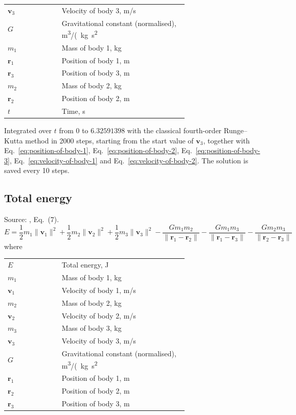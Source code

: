 \noindent\begin{tabular}{@{\quad}l@{\quad}p{0.7\linewidth}@{}}
  $\mathbf{v}_3$ & Velocity of body 3, \si{m/s} \\
  $G$ & Gravitational constant (normalised), \si{m^{3}/(kg.s^{2}} \\
  $m_1$ & Mass of body 1, \si{kg} \\
  $\mathbf{r}_1$ & Position of body 1, \si{m} \\
  $\mathbf{r}_3$ & Position of body 3, \si{m} \\
  $m_2$ & Mass of body 2, \si{kg} \\
  $\mathbf{r}_2$ & Position of body 2, \si{m} \\
  $t$ & Time, \si{s} \\
\end{tabular}

\noindent Integrated over $t$ from $0$ to $6.32591398$ with the classical fourth-order Runge–Kutta method in 2000 steps, starting from the start value of $\mathbf{v}_3$, together with Eq.~\eqref{eq:position-of-body-1}, Eq.~\eqref{eq:position-of-body-2}, Eq.~\eqref{eq:position-of-body-3}, Eq.~\eqref{eq:velocity-of-body-1} and Eq.~\eqref{eq:velocity-of-body-2}. The solution is saved every 10 steps.

\subsection{Total energy}
Source: \cite{ref}, Eq.~(7).
\begin{equation}
  E = \frac{1}{2} m_1 \|\mathbf{v}_1\|^2 + \frac{1}{2} m_2 \|\mathbf{v}_2\|^2 + \frac{1}{2} m_3 \|\mathbf{v}_3\|^2 - \frac{G m_1 m_2}{\|\mathbf{r}_1 - \mathbf{r}_2\|} - \frac{G m_1 m_3}{\|\mathbf{r}_1 - \mathbf{r}_3\|} - \frac{G m_2 m_3}{\|\mathbf{r}_2 - \mathbf{r}_3\|}
  \label{eq:total-energy}
\end{equation}
\noindent where

\noindent\begin{tabular}{@{\quad}l@{\quad}p{0.7\linewidth}@{}}
  $E$ & Total energy, \si{J} \\
  $m_1$ & Mass of body 1, \si{kg} \\
  $\mathbf{v}_1$ & Velocity of body 1, \si{m/s} \\
  $m_2$ & Mass of body 2, \si{kg} \\
  $\mathbf{v}_2$ & Velocity of body 2, \si{m/s} \\
  $m_3$ & Mass of body 3, \si{kg} \\
  $\mathbf{v}_3$ & Velocity of body 3, \si{m/s} \\
  $G$ & Gravitational constant (normalised), \si{m^{3}/(kg.s^{2}} \\
  $\mathbf{r}_1$ & Position of body 1, \si{m} \\
  $\mathbf{r}_2$ & Position of body 2, \si{m} \\
  $\mathbf{r}_3$ & Position of body 3, \si{m} \\
\end{tabular}


